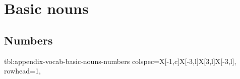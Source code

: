 \documentclass[../nihongo-gakushuu-kyouzai-supplementary.tex]{subfiles}
\begin{document}
\appendix
\setcounter{section}{1}

\section{Basic nouns} \label{sec:appendix-basic-nouns}

\subsection{Numbers}
{tbl:appendix-vocab-basic-nouns-numbers}  %
{}  %
{
    colspec={X[-1,c]X[-3,l]X[3,l]X[-3,l]},
    rowhead=1,
}  %
\end{document}
